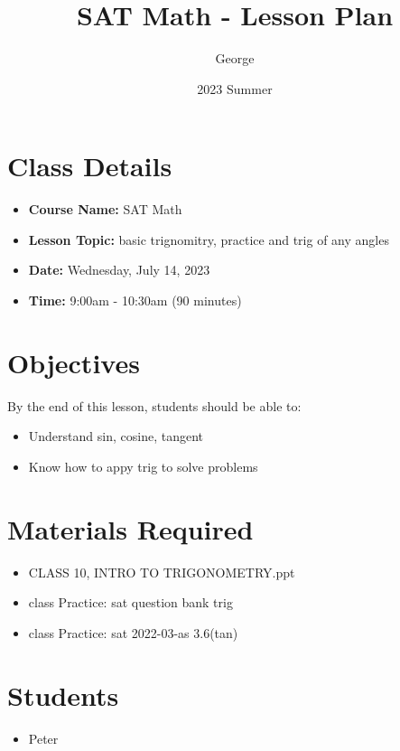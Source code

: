 \documentclass[12pt]{article}
\title{SAT Math - Lesson Plan}
\author{George}
\date{2023 Summer}
\begin{document}
\maketitle

\section{Class Details}
\begin{itemize}
    \item \textbf{Course Name:} SAT Math
    \item \textbf{Lesson Topic:}  basic trignomitry, practice and trig of any angles
    \item \textbf{Date:} Wednesday, July 14, 2023
    \item \textbf{Time:} 9:00am - 10:30am (90 minutes)
\end{itemize}

\section{Objectives}
By the end of this lesson, students should be able to:
\begin{itemize}
    \item Understand sin, cosine, tangent
    \item Know how to appy trig to solve problems

\end{itemize}

\section{Materials Required}
\begin{itemize}
   
    \item CLASS 10, INTRO TO TRIGONOMETRY.ppt
    \item class Practice: sat question bank trig
    \item class Practice: sat 2022-03-as 3.6(tan)
  
\end{itemize}


\section{Students}
\begin{itemize}
    \item Peter

\end{itemize}
\end{document}
